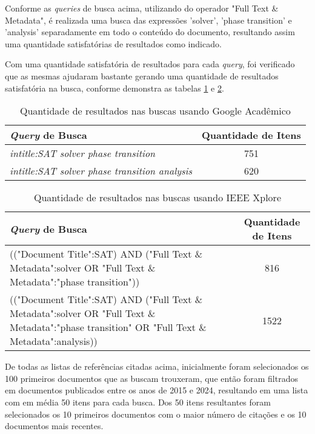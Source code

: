 Conforme as \textit{queries} de busca acima, utilizando do operador "Full Text \& Metadata", é realizada uma busca das expressões 'solver', 'phase transition' e 'analysis' separadamente em todo o conteúdo do documento, resultando assim uma quantidade satisfatórias de resultados como indicado.

Com uma quantidade satisfatória de resultados para cada \textit{query}, foi verificado que as mesmas ajudaram bastante gerando uma quantidade de resultados satisfatória na busca, conforme demonstra as tabelas \ref{table:gs_result} e \ref{table:ieee_result}.

\begin{table}[!htb]
\centering
\caption{Quantidade de resultados nas buscas usando Google Acadêmico}
\begin{tabular}{|l|c|}
\hline
\rowcolor[HTML]{C0C0C0} 
\textbf{\textit{Query} de Busca}                      & \textbf{Quantidade de Itens} \\ \hline
\textit{intitle:SAT solver phase transition}          & 751                          \\ \hline
\textit{intitle:SAT solver phase transition analysis} & 620                          \\ \hline
\end{tabular}\label{table:gs_result}
\end{table}

\begin{table}[!htb]
\centering
\caption{Quantidade de resultados nas buscas usando IEEE Xplore}
\begin{tabular}{|p{10cm}|c|}
\hline
\rowcolor[HTML]{C0C0C0} 
\textbf{\textit{Query} de Busca} & \textbf{Quantidade de Itens} \\ \hline
(("Document Title":SAT) AND ("Full Text \& Metadata":solver OR "Full Text \& Metadata":"phase transition")) & 816 \\ \hline
(("Document Title":SAT) AND ("Full Text \& Metadata":solver OR "Full Text \& Metadata":"phase transition" OR "Full Text \& Metadata":analysis)) & 1522 \\ \hline
\end{tabular}
\label{table:ieee_result}
\end{table}

De todas as listas de referências citadas acima, inicialmente foram selecionados os 100 primeiros documentos que as buscam trouxeram, que então foram filtrados em documentos publicados entre os anos de 2015 e 2024, resultando em uma lista com em média 50 itens para cada busca. Dos 50 itens resultantes foram selecionados os 10 primeiros documentos com o maior número de citações e os 10 documentos mais recentes.

